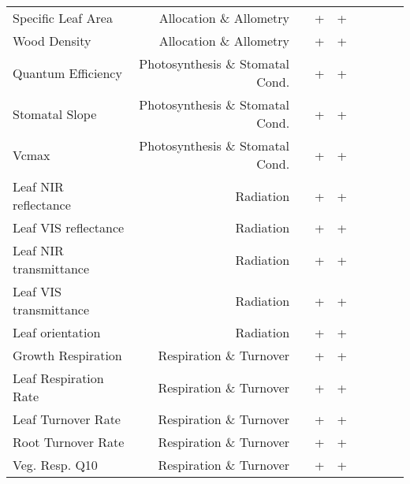 \begin{table}[!htp]
\begin{tabular}{lrrcc|rrrr}
Specific Leaf Area &Allocation \& Allometry & &+ &+ & & & \\
Wood Density &Allocation \& Allometry & &+ &+ & & & \\
Quantum Efficiency &Photosynthesis \& Stomatal Cond. & &+ &+ & & & \\
Stomatal Slope &Photosynthesis \& Stomatal Cond. & &+ &+ & & & \\
Vcmax &Photosynthesis \& Stomatal Cond. & &+ &+ & & & \\
Leaf NIR reflectance &Radiation & &+ &+ & & & \\
Leaf VIS reflectance &Radiation & &+ &+ & & & \\
Leaf NIR transmittance &Radiation & &+ &+ & & & \\
Leaf VIS transmittance &Radiation & &+ &+ & & & \\
Leaf orientation &Radiation & &+ &+ & & & \\
Growth Respiration &Respiration \& Turnover & &+ &+ & & & \\
Leaf Respiration Rate &Respiration \& Turnover & &+ &+ & & & \\
Leaf Turnover Rate &Respiration \& Turnover & &+ &+ & & & \\
Root Turnover Rate &Respiration \& Turnover & &+ &+ & & & \\
Veg. Resp. Q10 &Respiration \& Turnover & &+ &+ & & & \\
\bottomrule
\end{tabular}
\end{table}